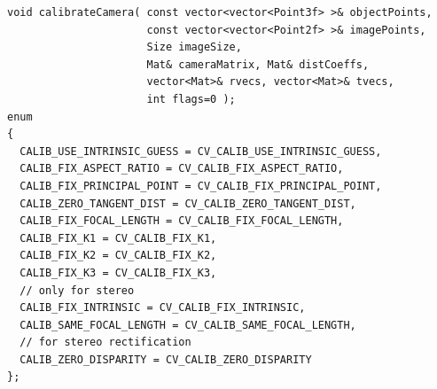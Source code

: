 \begin{description}
\begin{lstlisting}
void calibrateCamera( const vector<vector<Point3f> >& objectPoints,
                      const vector<vector<Point2f> >& imagePoints,
                      Size imageSize,
                      Mat& cameraMatrix, Mat& distCoeffs,
                      vector<Mat>& rvecs, vector<Mat>& tvecs,
                      int flags=0 );
enum
{
  CALIB_USE_INTRINSIC_GUESS = CV_CALIB_USE_INTRINSIC_GUESS,
  CALIB_FIX_ASPECT_RATIO = CV_CALIB_FIX_ASPECT_RATIO,
  CALIB_FIX_PRINCIPAL_POINT = CV_CALIB_FIX_PRINCIPAL_POINT,
  CALIB_ZERO_TANGENT_DIST = CV_CALIB_ZERO_TANGENT_DIST,
  CALIB_FIX_FOCAL_LENGTH = CV_CALIB_FIX_FOCAL_LENGTH,
  CALIB_FIX_K1 = CV_CALIB_FIX_K1,
  CALIB_FIX_K2 = CV_CALIB_FIX_K2,
  CALIB_FIX_K3 = CV_CALIB_FIX_K3,
  // only for stereo
  CALIB_FIX_INTRINSIC = CV_CALIB_FIX_INTRINSIC,
  CALIB_SAME_FOCAL_LENGTH = CV_CALIB_SAME_FOCAL_LENGTH,
  // for stereo rectification
  CALIB_ZERO_DISPARITY = CV_CALIB_ZERO_DISPARITY
};
\end{lstlisting}


\end{description}
